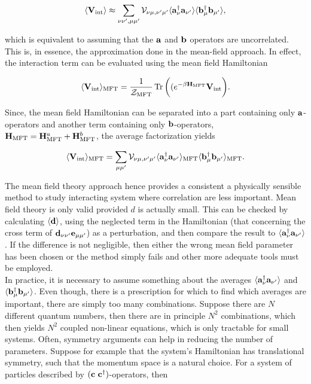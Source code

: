 \documentclass{homework}
\begin{document}
$$
    \langle {\bf V}_{\textnormal{int}} \rangle \approx \sum_{\nu \nu', \mu \mu'} {\mathcal{V}}_{\nu\mu, \nu'\mu'} \langle {\bf a}_{\nu}^\dagger {\bf a}_{\nu'} \rangle \langle {\bf b}_{\mu}^\dagger {\bf b}_{\mu'} \rangle,
$$

which is equivalent to assuming that the ${\bf a}$ and ${\bf b}$ operators are uncorrelated. This is, in essence, the approximation done in the mean-field approach. In effect, the interaction term can be evaluated using the mean field Hamiltonian 

$$
    \langle {\bf V}_{\textnormal{int}} \rangle_{\textnormal{MFT}} = \frac{1}{\mathcal{Z}_{\textnormal{MFT}}} \Tr \bigg((e^{-\beta {\bf H}_{\textnormal{MFT}}} {\bf V}_{\textnormal{int}}\bigg). 
$$

Since, the mean field Hamiltonian can be separated into a part containing only ${\bf a}$-operators and another term containing only ${\bf b}$-operators, ${\bf H}_{\textnormal{MFT}} = {\bf H}_{\textnormal{MFT}}^a + {\bf H}_{\textnormal{MFT}}^b$, the average factorization yields

\begin{equation}
    \langle {\bf V}_{\textnormal{int}} \rangle_{\textnormal{MFT}} = \sum_{\mu\mu'} {\mathcal{V}}_{\nu\mu, \nu'\mu'} \langle {\bf a}_{\nu}^\dagger {\bf a}_{\nu'} \rangle_{\textnormal{MFT}} \langle {\bf b}_{\mu}^\dagger {\bf b}_{\mu'} \rangle _{\textnormal{MFT}}.
\end{equation}

The mean field theory approach hence provides a consistent a physically sensible method to study interacting system where correlation are less important. Mean field theory is only valid provided $d$ is actually small. This can be checked by calculating $\langle {\bf d} \rangle$, using the neglected term in the Hamiltonian (that concerning the cross term of ${{\bf d}_{\nu \nu'} {\bf e}_{\mu\mu'}}$) as a perturbation, and then compare the result to $\langle {\bf a}_{\nu}^\dagger {\bf a}_{\nu'} \rangle$. If the difference is not negligible, then either the wrong mean field parameter has been chosen or the method simply fails and other more adequate tools must be employed. \\

In practice, it is necessary to assume something about the averages $\langle {\bf a}_{\nu}^\dagger {\bf a}_{\nu'}\rangle$ and $\langle {\bf b}_{\mu}^\dagger {\bf b}_{\mu'} \rangle$. Even though, there is a prescription for which to find which averages are important, there are simply too many combinations. Suppose there are $N$ different quantum numbers, then there are in principle $N^2$ combinations, which then yields $N^2$ coupled non-linear equations, which is only tractable for small systems. Often, symmetry arguments can help in reducing the number of parameters. Suppose for example that the system's Hamiltonian has translational symmetry, such that the momentum space is a natural choice. For a system of particles described by $({\bf c} \textnormal{ } {\bf c}^\dagger)$-operators, then 
\end{document}

